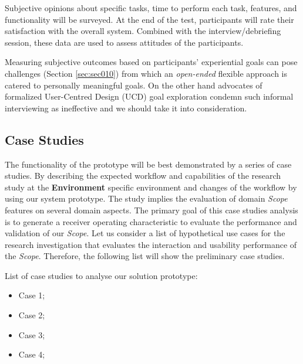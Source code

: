 Subjective opinions about specific tasks, time to perform each task, features, and functionality will be surveyed. At the end of the test, participants will rate their satisfaction with the overall system. Combined with the interview/debriefing session, these data are used to assess attitudes of the participants.

Measuring subjective outcomes based on participants' experiential goals can pose challenges (Section \ref{sec:sec010}) from which an {\it open-ended} flexible approach is catered to personally meaningful goals. On the other hand advocates of formalized User-Centred Design (UCD) goal exploration condemn such informal interviewing as ineffective and we should take it into consideration.



\subsection{Case Studies}

The functionality of the prototype will be best demonstrated by a series of case studies. By describing the expected workflow and capabilities of the research study at the \textbf{Environment} specific environment and changes of the workflow by using our system prototype. The study implies the evaluation of domain \textit{Scope} features on several domain aspects. The primary goal of this case studies analysis is to generate a receiver operating characteristic to evaluate the performance and validation of our \textit{Scope}. Let us consider a list of hypothetical use cases for the research investigation that evaluates the interaction and usability performance of the \textit{Scope}. Therefore, the following list will show the preliminary case studies.

\clearpage

List of case studies to analyse our solution prototype:

\hfill

\begin{itemize}
\item Case 1;
\item Case 2;
\item Case 3;
\item Case 4;
\end{itemize}

\hfill